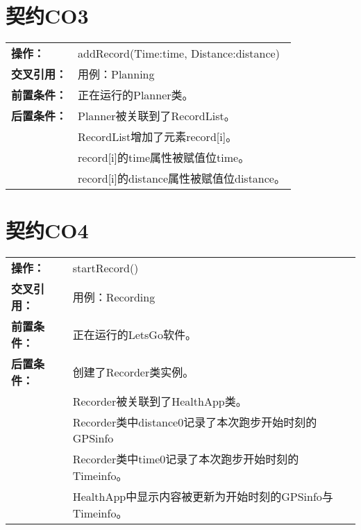 \documentclass [a4paper,11pt]{article}
\begin{document}
\begin{table}[!hbp]
\section*{契约CO3}
\centering
\begin{tabular*}{\textwidth}{p{}p{}}
\textbf{操作：} & addRecord(Time:time, Distance:distance)\\
\textbf{交叉引用：} & 用例：Planning\\
\textbf{前置条件：} & 正在运行的Planner类。\\
\textbf{后置条件：} &	Planner被关联到了RecordList。\\
	&RecordList增加了元素record[i]。\\
	&record[i]的time属性被赋值位time。\\
	&record[i]的distance属性被赋值位distance。\\
\end{tabular*}
\end{table}

\begin{table}[!hbp]
\section*{契约CO4}
\centering
\begin{tabular*}{\textwidth}{p{}p{}}
\textbf{操作：} & startRecord()\\
\textbf{交叉引用：} & 用例：Recording\\
\textbf{前置条件：} & 正在运行的LetsGo软件。\\
\textbf{后置条件：} &创建了Recorder类实例。\\
	&Recorder被关联到了HealthApp类。\\
	&Recorder类中distance0记录了本次跑步开始时刻的GPSinfo\\
	&Recorder类中time0记录了本次跑步开始时刻的Timeinfo。\\
	&HealthApp中显示内容被更新为开始时刻的GPSinfo与Timeinfo。\\
\end{tabular*}
\end{table}
\end{document}
